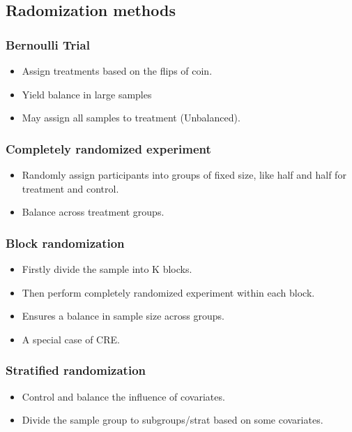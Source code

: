 \subsection{Radomization methods}
\subsubsection*{Bernoulli Trial}
\begin{itemize}
    \item Assign treatments based on the flips of coin.
    \item Yield balance in large samples
    \item May assign all samples to treatment (Unbalanced).
\end{itemize}
\subsubsection*{Completely randomized experiment}
\begin{itemize}
    \item Randomly assign participants into groups of fixed size, like half and half for treatment and control.
    \item Balance across treatment groups.
\end{itemize}
\subsubsection*{Block randomization}
\begin{itemize}
    \item Firstly divide the sample into K blocks.
    \item Then perform completely randomized experiment within each block.
    \item Ensures a balance in sample size across groups.
    \item A special case of CRE.
\end{itemize}
\subsubsection*{Stratified randomization}
\begin{itemize}
    \item Control and balance the influence of covariates.
    \item Divide the sample group to subgroups/strat based on some covariates.
\end{itemize}
